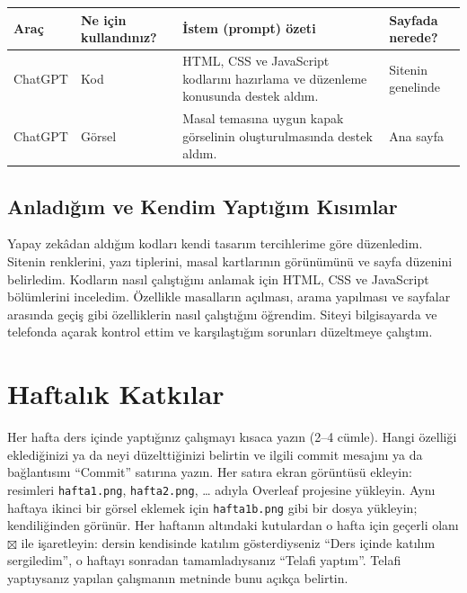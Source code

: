 \documentclass[12pt,a4paper]{article}
\begin{document}
\begin{longtable}{@{}p{2.6cm}p{3.6cm}p{4.2cm}p{3.4cm}@{}}
\toprule
\textbf{Araç} & \textbf{Ne için kullandınız?} & \textbf{İstem (prompt) özeti} & \textbf{Sayfada nerede?} \\
\midrule
\endhead
ChatGPT & Kod & HTML, CSS ve JavaScript kodlarını hazırlama ve düzenleme konusunda destek aldım. & Sitenin genelinde \\
ChatGPT & Görsel & Masal temasına uygun kapak görselinin oluşturulmasında destek aldım. & Ana sayfa \\
\bottomrule
\end{longtable}

\subsection{Anladığım ve Kendim Yaptığım Kısımlar}
Yapay zekâdan aldığım kodları kendi tasarım tercihlerime göre düzenledim. Sitenin renklerini, yazı tiplerini, masal kartlarının görünümünü ve sayfa düzenini belirledim. Kodların nasıl çalıştığını anlamak için HTML, CSS ve JavaScript bölümlerini inceledim. Özellikle masalların açılması, arama yapılması ve sayfalar arasında geçiş gibi özelliklerin nasıl çalıştığını öğrendim. Siteyi bilgisayarda ve telefonda açarak kontrol ettim ve karşılaştığım sorunları düzeltmeye çalıştım.

\section{Haftalık Katkılar}
Her hafta ders içinde yaptığınız çalışmayı kısaca yazın (2--4 cümle). Hangi
özelliği eklediğinizi ya da neyi düzelttiğinizi belirtin ve ilgili commit mesajını
ya da bağlantısını ``Commit'' satırına yazın. Her satıra ekran görüntüsü ekleyin:
resimleri \texttt{hafta1.png}, \texttt{hafta2.png}, \ldots{} adıyla Overleaf
projesine yükleyin. Aynı haftaya ikinci bir görsel eklemek için
\texttt{hafta1b.png} gibi bir dosya yükleyin; kendiliğinden görünür.
Her haftanın altındaki kutulardan o hafta için geçerli olanı $\boxtimes$ ile
işaretleyin: dersin kendisinde katılım gösterdiyseniz ``Ders içinde katılım
sergiledim'', o haftayı sonradan tamamladıysanız ``Telafi yaptım''. Telafi
yaptıysanız yapılan çalışmanın metninde bunu açıkça belirtin.
\end{document}
